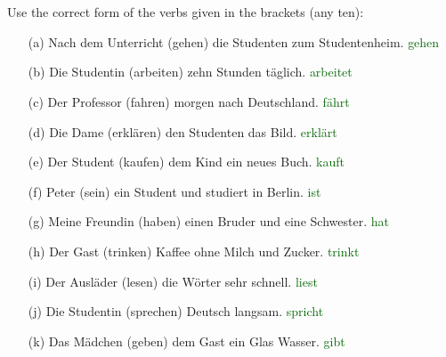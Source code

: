 \documentclass{article}
\begin{document}
\section*{}
    Use the correct form of the verbs given in the brackets (any ten):
    \begin{enumerate}
        \item[(a)] Nach dem Unterricht (gehen) die Studenten zum Studentenheim. \textcolor{darkgreen}{gehen}
        \item[(b)] Die Studentin (arbeiten) zehn Stunden täglich. \textcolor{darkgreen}{arbeitet}
        \item[(c)] Der Professor (fahren) morgen nach Deutschland. \textcolor{darkgreen}{fährt}
        \item[(d)] Die Dame (erklären) den Studenten das Bild. \textcolor{darkgreen}{erklärt}
        \item[(e)] Der Student (kaufen) dem Kind ein neues Buch. \textcolor{darkgreen}{kauft}
        \item[(f)] Peter (sein) ein Student und studiert in Berlin. \textcolor{darkgreen}{ist}
        \item[(g)] Meine Freundin (haben) einen Bruder und eine Schwester. \textcolor{darkgreen}{hat}
        \item[(h)] Der Gast (trinken) Kaffee ohne Milch und Zucker. \textcolor{darkgreen}{trinkt}
        \item[(i)] Der Ausläder (lesen) die Wörter sehr schnell. \textcolor{darkgreen}{liest}
        \item[(j)] Die Studentin (sprechen) Deutsch langsam. \textcolor{darkgreen}{spricht}
        \item[(k)] Das Mädchen (geben) dem Gast ein Glas Wasser. \textcolor{darkgreen}{gibt}
\end{enumerate}
\end{document}
